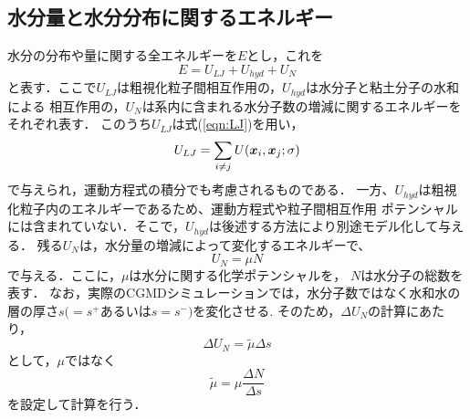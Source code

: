 \subsection{水分量と水分分布に関するエネルギー}
水分の分布や量に関する全エネルギーを$E$とし，これを
\begin{equation}
	E=U_{LJ} +U_{hyd} + U_N
	\label{eqn:}
\end{equation}
と表す．ここで$U_{LJ}$は粗視化粒子間相互作用の，$U_{hyd}$は水分子と粘土分子の水和による
相互作用の，$U_N$は系内に含まれる水分子数の増減に関するエネルギーをそれぞれ表す．
このうち$U_{LJ}$は式(\ref{eqn:LJ})を用い，
\begin{equation}
	U_{LJ}=\sum_{i\neq j} U(\mbox{\boldmath $x$}_i,\mbox{\boldmath $x$}_j;\sigma)
	\label{eqn:}
\end{equation}
で与えられ，運動方程式の積分でも考慮されるものである．
一方、$U_{hyd}$は粗視化粒子内のエネルギーであるため、運動方程式や粒子間相互作用
ポテンシャルには含まれていない．そこで，$U_{hyd}$は後述する方法により別途モデル化して与える．
残る$U_N$は，水分量の増減によって変化するエネルギーで、
\begin{equation}
	U_N=\mu N
	\label{eqn:U_N}
\end{equation}
で与える．ここに，$\mu$は水分に関する化学ポテンシャルを， $N$は水分子の総数を表す．
なお，実際のCGMDシミュレーションでは，水分子数ではなく水和水の層の厚さ$s(=s^{+}$あるいは$s=s^{-})$を変化させる. 
そのため，$\Delta U_N$の計算にあたり，
\begin{equation}
	\Delta U_N =\tilde \mu \Delta s
	\label{eqn:}
\end{equation}
として，$\mu$ではなく
\begin{equation}
	\tilde \mu =\mu \frac{\Delta N}{\Delta s}
	\label{eqn:}
\end{equation}
を設定して計算を行う．
